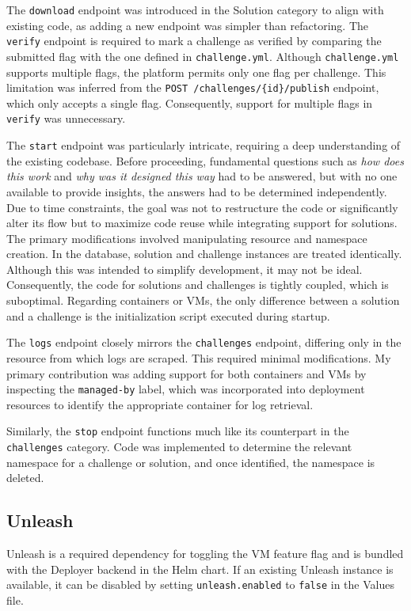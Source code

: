 The \texttt{download} endpoint was introduced in the Solution category to align with existing code, as adding a new endpoint was simpler than refactoring. The \texttt{verify} endpoint is required to mark a challenge as verified by comparing the submitted flag with the one defined in \texttt{challenge.yml}. Although \texttt{challenge.yml} supports multiple flags, the platform permits only one flag per challenge. This limitation was inferred from the \texttt{POST /challenges/\{id\}/publish} endpoint, which only accepts a single flag. Consequently, support for multiple flags in \texttt{verify} was unnecessary.

The \texttt{start} endpoint was particularly intricate, requiring a deep understanding of the existing codebase. Before proceeding, fundamental questions such as \textit{how does this work} and \textit{why was it designed this way} had to be answered, but with no one available to provide insights, the answers had to be determined independently. Due to time constraints, the goal was not to restructure the code or significantly alter its flow but to maximize code reuse while integrating support for solutions. The primary modifications involved manipulating resource and namespace creation. In the database, solution and challenge instances are treated identically. Although this was intended to simplify development, it may not be ideal. Consequently, the code for solutions and challenges is tightly coupled, which is suboptimal. Regarding containers or VMs, the only difference between a solution and a challenge is the initialization script executed during startup.

The \texttt{logs} endpoint closely mirrors the \texttt{challenges} endpoint, differing only in the resource from which logs are scraped. This required minimal modifications. My primary contribution was adding support for both containers and VMs by inspecting the \texttt{managed-by} label, which was incorporated into deployment resources to identify the appropriate container for log retrieval.

Similarly, the \texttt{stop} endpoint functions much like its counterpart in the \texttt{challenges} category. Code was implemented to determine the relevant namespace for a challenge or solution, and once identified, the namespace is deleted.

\subsection{Unleash}
Unleash is a required dependency for toggling the VM feature flag and is bundled with the Deployer backend in the Helm chart. If an existing Unleash instance is available, it can be disabled by setting \texttt{unleash.enabled} to \texttt{false} in the Values file.

